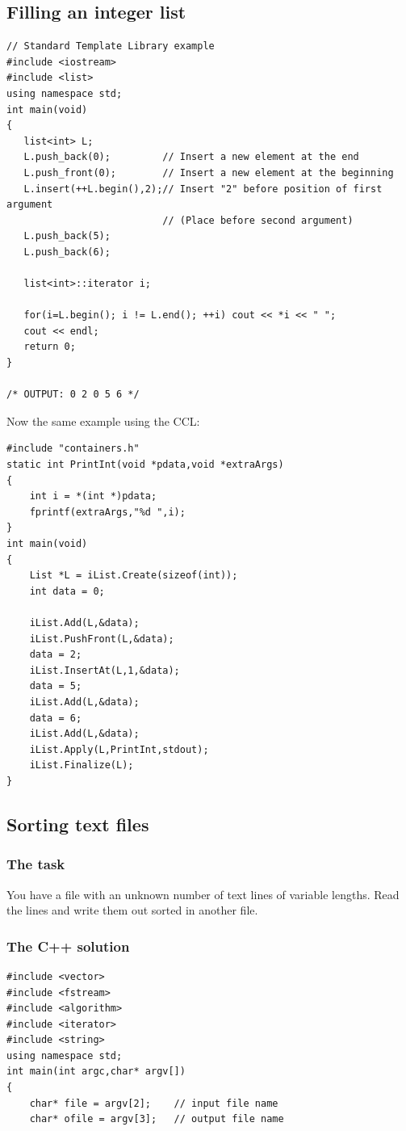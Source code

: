 \documentclass[12pt,a4paper]{memoir} %
\begin{document}
{{\subsection{Filling an integer list}
\begin{verbatim}
// Standard Template Library example
#include <iostream>
#include <list>
using namespace std;
int main(void)
{
   list<int> L;
   L.push_back(0);         // Insert a new element at the end
   L.push_front(0);        // Insert a new element at the beginning
   L.insert(++L.begin(),2);// Insert "2" before position of first argument
                           // (Place before second argument)
   L.push_back(5);
   L.push_back(6);

   list<int>::iterator i;

   for(i=L.begin(); i != L.end(); ++i) cout << *i << " ";
   cout << endl;
   return 0;
}

/* OUTPUT: 0 2 0 5 6 */ 
\end{verbatim}

Now the same example using the CCL:
\begin{verbatim}
#include "containers.h"
static int PrintInt(void *pdata,void *extraArgs)
{
    int i = *(int *)pdata;
    fprintf(extraArgs,"%d ",i);
}
int main(void)
{
    List *L = iList.Create(sizeof(int));
    int data = 0;

    iList.Add(L,&data);
    iList.PushFront(L,&data);
    data = 2;
    iList.InsertAt(L,1,&data);
    data = 5;
    iList.Add(L,&data);
    data = 6;
    iList.Add(L,&data);
    iList.Apply(L,PrintInt,stdout);
    iList.Finalize(L);
} 
\end{verbatim}
\subsection{Sorting text files}
\subsubsection{The task}
You have a file with an unknown number of text lines of variable
lengths. Read the lines and write them out sorted in another file.

\subsubsection{The C++ solution}
\begin{verbatim}
#include <vector>
#include <fstream>
#include <algorithm>
#include <iterator>
#include <string>
using namespace std;
int main(int argc,char* argv[])
{
    char* file = argv[2];    // input file name
    char* ofile = argv[3];   // output file name


\end{verbatim}}}
\end{document}
